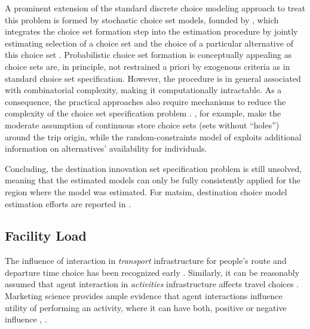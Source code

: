 A prominent extension of the standard discrete choice modeling approach to treat this problem is formed by stochastic choice set models, founded by \citet[][]{Manski_TD_1977, BurnettKPHanson_TRR_1979, BurnettKP_UG_1980}, which integrates the choice set formation step into the estimation procedure by jointly estimating selection of a choice set and the choice of a particular alternative of this choice set 
\citep[][]{Manski_TD_1977, BenAkivaBoccara_IJRM_1995}. 
%
Probabilistic choice set formation is conceptually appealing as choice sets are, in principle, not restrained a priori by exogenous criteria as in standard choice set specification. 
However, the procedure is in general associated with combinatorial complexity, making it computationally intractable. 
As a consequence, the practical approaches also require mechanisms to reduce the complexity of the choice set specification problem \citep[e.g.,][p.11]{BenAkivaBoccara_IJRM_1995}. 
\citet[][]{ZhengJieGuo_TRB_2008}, for example, make the moderate assumption of continuous store choice sets (\ie sets without ``holes'') around the trip origin, while the random-constraints model of \citet[][]{BenAkivaBoccara_IJRM_1995} exploits additional information on alternatives' availability for individuals.

Concluding, the destination innovation set specification problem is still unsolved, meaning that the estimated models can only be fully consistently applied for the region where the model was estimated. 
For \gls{matsim}, 
destination choice model estimation efforts are reported in \citet[][Chapter 5]{Horni_PhDThesis_2013}.

\subsection{Facility Load}
\label{sec:facilityload}
The influence of interaction in \emph{transport} infrastructure for people's route and departure time choice has been recognized early \citep[e.g.,][]{Pigou_1920, Knight_QJE_1924, Wardrop_PICE_1952}. 
Similarly, it can be reasonably assumed that agent interaction in \emph{activities} infrastructure affects travel choices \citep[][]{Axhausen_SSRL_2006}. 
Marketing science provides ample evidence that agent interactions influence utility of performing an activity, where it can have both, positive or negative influence \citep[][p.331]{BakerJEtAl_JAMS_1994}, \citep[][]{ErogluAndHarrell_JR_1986, ErogluAndMachleit_JR_1990, ErogluEtAl_JBR_2005, HarrellEtAl_JMR_1980, HuiAndBateson_JCR_1991, PonsEtAl_PsychMark_2006}.

